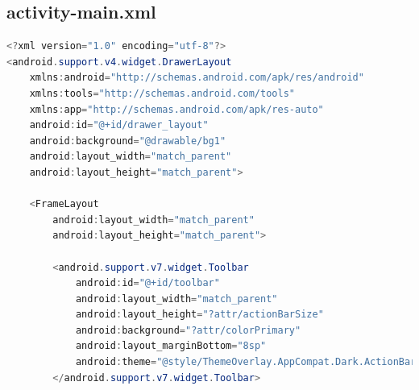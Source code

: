 \documentclass[UTF8, Microsoft YaHei]{book}
\begin{document}
    \subsection{activity-main.xml}
\begin{small}
\begin{lstlisting}[language=java]
<?xml version="1.0" encoding="utf-8"?>
<android.support.v4.widget.DrawerLayout
    xmlns:android="http://schemas.android.com/apk/res/android"
    xmlns:tools="http://schemas.android.com/tools"
    xmlns:app="http://schemas.android.com/apk/res-auto"
    android:id="@+id/drawer_layout"
    android:background="@drawable/bg1"
    android:layout_width="match_parent"
    android:layout_height="match_parent">

    <FrameLayout
        android:layout_width="match_parent"
        android:layout_height="match_parent">

        <android.support.v7.widget.Toolbar
            android:id="@+id/toolbar"
            android:layout_width="match_parent"
            android:layout_height="?attr/actionBarSize"
            android:background="?attr/colorPrimary"
            android:layout_marginBottom="8sp"
            android:theme="@style/ThemeOverlay.AppCompat.Dark.ActionBar">
        </android.support.v7.widget.Toolbar>


\end{lstlisting}
\end{small}
\end{document}
